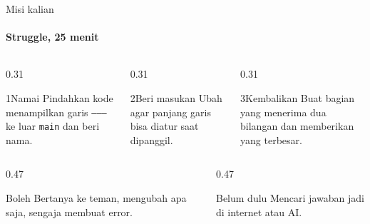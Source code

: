 \documentclass[t]{beamer}
\begin{document}

\begin{frame}{Misi kalian}
\framesubtitle{Struggle, 25 menit}
\begin{columns}[T]
\begin{column}{0.31\textwidth}
\begin{Langkah}{1}{Namai}
Pindahkan kode menampilkan garis \texttt{--------} ke luar \texttt{main} dan beri nama.
\end{Langkah}
\end{column}
\begin{column}{0.31\textwidth}
\begin{Langkah}{2}{Beri masukan}
Ubah agar panjang garis bisa diatur saat dipanggil.
\end{Langkah}
\end{column}
\begin{column}{0.31\textwidth}
\begin{Langkah}{3}{Kembalikan}
Buat bagian yang menerima dua bilangan dan memberikan yang terbesar.
\end{Langkah}
\end{column}
\end{columns}
\vspace{8pt}
\begin{columns}[T]
\begin{column}{0.47\textwidth}
\begin{Blok}{Boleh}
Bertanya ke teman, mengubah apa saja, sengaja membuat error.
\end{Blok}
\end{column}
\begin{column}{0.47\textwidth}
\begin{BlokAlert}{Belum dulu}
Mencari jawaban jadi di internet atau AI.
\end{BlokAlert}
\end{column}
\end{columns}
\end{frame}
\end{document}
